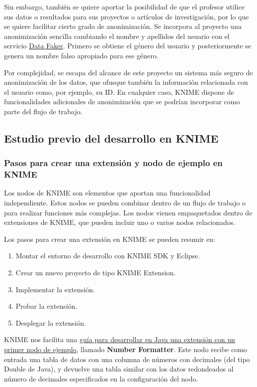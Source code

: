 Sin embargo, también se quiere aportar la posibilidad de que el profesor utilice sus datos o resultados para sus 
proyectos o artículos de investigación, por lo que se quiere facilitar cierto grado de anonimización. Se incorpora al proyecto
una anonimización sencilla cambiando el nombre y apellidos del usuario con el servicio \href{https://www.datafaker.net/}{Data Faker}. Primero se obtiene el 
género del usuario y posteriormente se genera un nombre falso apropiado para ese género. 
\

Por complejidad, se escapa del alcance de este proyecto un sistema más seguro de anonimización de los datos, que ofusque 
también la información relacionada con el usuario como, por ejemplo, su ID. En cualquier caso, KNIME dispone de funcionalidades
adicionales de anonimización que se podrían incorporar como parte del flujo de trabajo. 


\subsection{Estudio previo del desarrollo en KNIME}

\subsubsection{Pasos para crear una extensión y nodo de ejemplo en KNIME}

Los nodos de KNIME son elementos que aportan una funcionalidad independiente. Estos nodos se pueden combinar dentro de un 
flujo de trabajo o  para realizar funciones más complejas. Los nodos vienen empaquetados dentro de extensiones de KNIME, que 
pueden incluir uno o varios nodos relacionados. 
\

Los pasos para crear una extensión en KNIME se pueden resumir en: 

\begin{enumerate}
	\item Montar el entorno de desarrollo con KNIME SDK y Eclipse.
	\item Crear un nuevo proyecto de tipo KNIME Extension. 
	\item Implementar la extensión. 
	\item Probar la extensión. 
	\item Desplegar la extensión. 
\end{enumerate}

KNIME nos facilita una \href{https://docs.knime.com/latest/analytics_platform_new_node_quickstart_guide/index.html\#_introduction}{guía 
para desarrollar en Java una extensión con un primer nodo de ejemplo}, llamado \textbf{Number Formatter}. Este nodo recibe como entrada 
una tabla de datos con una columna de números con decimales (del tipo Double de Java), y devuelve una tabla similar con los datos redondeados 
al número de decimales especificados en la configuración del nodo. 
\


